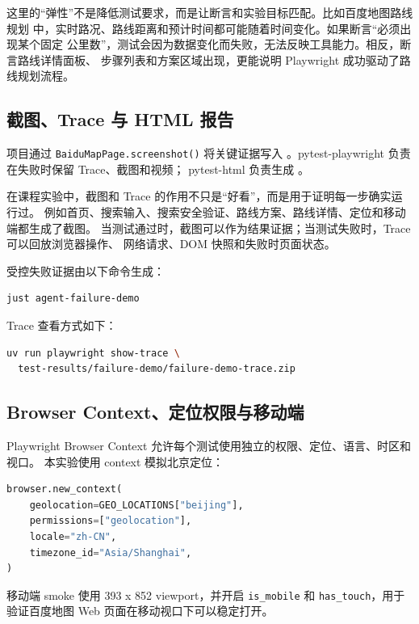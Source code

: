 \documentclass[UTF8,a4paper,12pt]{ctexart}
\begin{document}
这里的“弹性”不是降低测试要求，而是让断言和实验目标匹配。比如百度地图路线规划
中，实时路况、路线距离和预计时间都可能随着时间变化。如果断言“必须出现某个固定
公里数”，测试会因为数据变化而失败，无法反映工具能力。相反，断言路线详情面板、
步骤列表和方案区域出现，更能说明 Playwright 成功驱动了路线规划流程。

\subsection{截图、Trace 与 HTML 报告}

项目通过 \texttt{BaiduMapPage.screenshot()} 将关键证据写入
。pytest-playwright 负责在失败时保留 Trace、截图和视频；
pytest-html 负责生成 。

在课程实验中，截图和 Trace 的作用不只是“好看”，而是用于证明每一步确实运行过。
例如首页、搜索输入、搜索安全验证、路线方案、路线详情、定位和移动端都生成了截图。
当测试通过时，截图可以作为结果证据；当测试失败时，Trace 可以回放浏览器操作、
网络请求、DOM 快照和失败时页面状态。

受控失败证据由以下命令生成：

\begin{lstlisting}[language=bash]
just agent-failure-demo
\end{lstlisting}

Trace 查看方式如下：

\begin{lstlisting}[language=bash]
uv run playwright show-trace \
  test-results/failure-demo/failure-demo-trace.zip
\end{lstlisting}

\subsection{Browser Context、定位权限与移动端}

Playwright Browser Context 允许每个测试使用独立的权限、定位、语言、时区和视口。
本实验使用 context 模拟北京定位：

\begin{lstlisting}[language=Python]
browser.new_context(
    geolocation=GEO_LOCATIONS["beijing"],
    permissions=["geolocation"],
    locale="zh-CN",
    timezone_id="Asia/Shanghai",
)
\end{lstlisting}

移动端 smoke 使用 393 x 852 viewport，并开启 \texttt{is\_mobile} 和
\texttt{has\_touch}，用于验证百度地图 Web 页面在移动视口下可以稳定打开。
\end{document}
